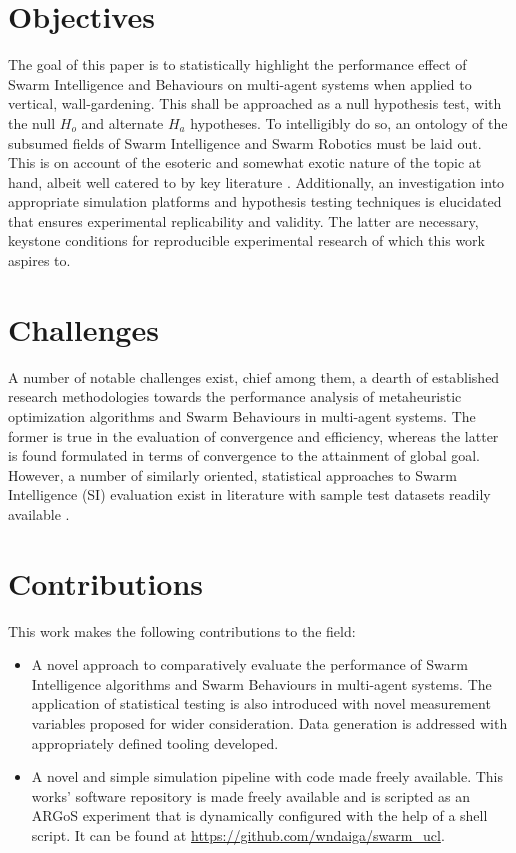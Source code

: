 \documentclass{report}
\begin{document}
\section{Objectives}

The goal of this paper is to statistically highlight the performance effect of Swarm Intelligence and Behaviours on multi-agent systems when applied to vertical, wall-gardening. This shall be approached as a null hypothesis test, with the null $H_o$ and alternate $H_a$ hypotheses. To intelligibly do so, an ontology of the subsumed fields of Swarm Intelligence and Swarm Robotics must be laid out. This is on account of the esoteric and somewhat exotic nature of the topic at hand, albeit well catered to by key literature \cite{Beni2005a} \cite{Iocchi2001} \cite{Galceran2013}. Additionally, an investigation into appropriate simulation platforms and hypothesis testing techniques is elucidated that ensures experimental replicability and validity. The latter are necessary, keystone conditions for reproducible experimental research of which this work aspires to.

\section{Challenges}
A number of notable challenges exist, chief among them, a dearth of established research methodologies towards the performance analysis of metaheuristic optimization algorithms \cite{Yang2011} and Swarm Behaviours in multi-agent systems. The former is true in the evaluation of convergence and efficiency, whereas the latter is found formulated in terms of convergence to the attainment of global goal.
However, a number of similarly oriented, statistical approaches to Swarm Intelligence (SI) evaluation exist in literature \cite{Selvi2010} \cite{Yang2011} with sample test datasets readily available \cite{Gerhard1991}.

\section{Contributions}
This work makes the following contributions to the field:

\begin{itemize}
	\item A novel approach to comparatively evaluate the performance of Swarm Intelligence algorithms and Swarm Behaviours in multi-agent systems. The application of statistical testing is also introduced with novel measurement variables proposed for wider consideration. Data generation is addressed with appropriately defined tooling developed.
	\item A novel and simple simulation pipeline with code made freely available. This works' software repository is made freely available and is scripted as an ARGoS experiment that is dynamically configured with the help of a shell script. It can be found at \url{https://github.com/wndaiga/swarm_ucl}.
\end{itemize}
\end{document}
